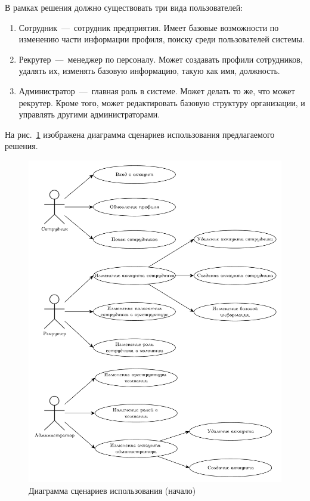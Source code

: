В рамках решения должно существовать три вида пользователей:

\begin{enumerate}
	\item Сотрудник~---~сотрудник предприятия. Имеет базовые возможности по изменению части информации профиля, поиску среди пользователей системы.
	\item Рекрутер~---~менеджер по персоналу. Может создавать профили сотрудников, удалять их, изменять базовую информацию, такую как имя, должность.
	\item Администратор~---~главная роль в системе. Может делать то же, что может рекрутер. Кроме того, может редактировать базовую структуру организации, и управлять другими администраторами.
\end{enumerate}

На рис.~\ref{img:use-case} изображена диаграмма сценариев использования предлагаемого решения.

\begin{figure}[h!]
\centering
    \includegraphics[width=0.9\linewidth]{assets/use-case.pdf}
    \caption{Диаграмма сценариев использования (начало)}
    \label{img:use-case}	
\end{figure}

